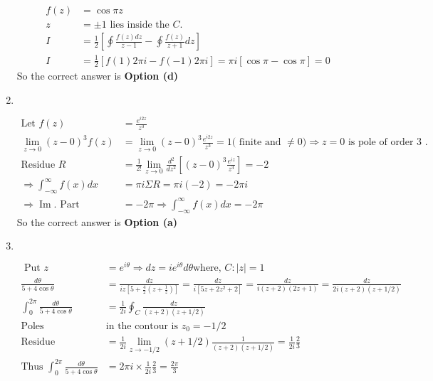 \begin{enumerate}
\begin{answer}
		\begin{align*}
		f(z)&=\cos \pi z\\
		z&=\pm 1\text{ lies inside the $C$.}\\
		I&=\frac{1}{2}\left[\oint \frac{f(z) d z}{z-1}-\oint \frac{f(z)}{z+1} d z\right]\\
		I&=\frac{1}{2}[f(1) 2 \pi i-f(-1) 2 \pi i]=\pi i[\cos \pi-\cos \pi]=0
		\end{align*}
		So the correct answer is \textbf{Option (d)}
	\end{answer}
		\item $\left. \right. $
	\begin{answer}
		\begin{align*}
		\text{Let }f(z)&=\frac{e^{i 2 z}}{z^{3}}\\
		\lim _{z \rightarrow 0}(z-0)^{3} f(z)&=\lim _{z \rightarrow 0}(z-0)^{3} \frac{e^{i 2 z}}{z^{3}}=1\text{( finite and $\neq 0) \Rightarrow z=0$ is pole of order 3 .}\\
		\text{Residue }R&=\frac{1}{2 !} \lim _{z \rightarrow 0} \frac{d^{2}}{d z^{2}}\left[(z-0)^{3} \frac{e^{i z}}{z^{3}}\right]=-2\\
		 \Rightarrow \int_{-\infty}^{\infty} f(x) d x&=\pi i \Sigma R=\pi i(-2)=-2 \pi i 
		\\\Rightarrow \operatorname{Im}.\text{ Part }&=-2 \pi \Rightarrow \int_{-\infty}^{\infty} f(x) d x=-2 \pi
			\end{align*}
		So the correct answer is \textbf{Option (a)}	
	\end{answer}
	\item $\left. \right. $
	\begin{answer}
		\begin{align*}
	\text{	Put }z&=e^{i \theta} \Rightarrow d z=i e^{i \theta} d \theta \text{where, }C:|z|=1\\
	\frac{d \theta}{5+4 \cos \theta}&=\frac{d z}{i z\left[5+\frac{4}{2}\left(z+\frac{1}{z}\right)\right]}=\frac{d z}{i\left[5 z+2 z^{2}+2\right]}=\frac{d z}{i(z+2)(2 z+1)}=\frac{d z}{2 i(z+2)(z+1 / 2)}\\
	\int_{0}^{2 \pi} \frac{d \theta}{5+4 \cos \theta}&=\frac{1}{2 i} \oint_{C} \frac{d z}{(z+2)(z+1 / 2)}\\
	\text{Poles }&\text{in the contour is }z_{0}=-1 / 2\\
	\text{Residue }&=\frac{1}{2 i} \lim _{z \rightarrow-1 / 2}(z+1 / 2) \frac{1}{(z+2)(z+1 / 2)}=\frac{1}{2 i} \frac{2}{3}\\
	\text{Thus }\int_{0}^{2 \pi} \frac{d \theta}{5+4 \cos \theta}&=2 \pi i \times \frac{1}{2 i} \frac{2}{3}=\frac{2 \pi}{3}

\end{align*}
\end{answer}
\end{enumerate}

